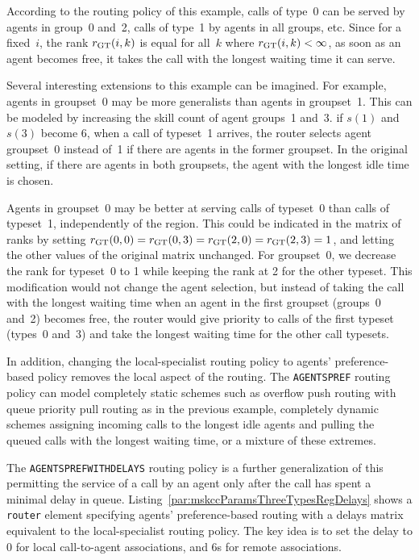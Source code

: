 According to the routing policy of this example,
calls of type~0 can be served by agents in group~0 and~2, calls of type~1 by
agents in all groups, etc.
Since for a fixed~$i$, the rank $\rGT(i, k)$ is equal for all~$k$ where
$\rGT(i, k)<\infty$, as soon as an agent
becomes free, it takes the call with the longest waiting time it can
serve.

Several interesting extensions to this example can be imagined.
For example, agents in groupset~0 may be more generalists than agents
in groupset~1.  This can be modeled by increasing the skill count of
agent groups~1 and~3.
if $s(1)$ and $s(3)$ become 6, when a call of typeset~1
arrives, the router selects agent groupset~0 instead of~1 if there
are agents in the former groupset.  In the original setting, if there are
agents in both groupsets, the agent with the longest idle time is chosen.

Agents in groupset~0 may be better at serving calls of typeset~0 than
calls of typeset~1, independently of the region.  This could be
indicated in the matrix of ranks by setting $\rGT(0, 0)=\rGT(0, 3)=\rGT(2,
0)=\rGT(2,3)=1$, and letting the other values of the original matrix
unchanged.  For groupset~0,
we decrease the rank for typeset~0 to 1 while keeping the rank at 2
for the other typeset.  This modification
would not change the agent selection, but instead of taking the call with
the longest waiting time when an agent in the first groupset (groups~0
and~2) becomes free, the router would give priority to calls of the
first typeset (types~0 and~3) and take the longest waiting time for the
other call typesets.

In addition, changing the local-specialist routing policy to
agents' preference-based policy removes the local aspect
of the routing.
The \texttt{AGENTSPREF} routing policy can model completely static
schemes such as overflow push routing with queue priority pull routing
as in the previous example, completely dynamic schemes
assigning incoming calls to the longest idle agents and pulling the
queued calls with the longest waiting time, or a mixture of these
extremes.

The \texttt{AGENTSPREFWITHDELAYS} routing policy is a further
generalization of this permitting the service of a call by an agent
only after the call has spent a minimal delay in queue.
Listing~\ref{par:mskccParamsThreeTypesRegDelays} shows a
\texttt{router} element specifying agents' preference-based routing with
a delays matrix equivalent to
the local-specialist routing policy.
The key idea is to set the delay to 0 for local call-to-agent
associations, and 6s
for remote associations.

